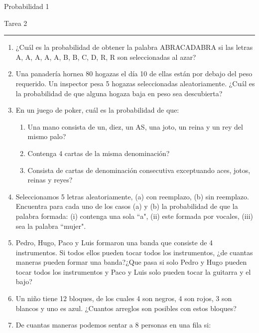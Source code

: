 \documentclass[12pt]{report}
\begin{document}
\begin{center}
    \textsf{\Large Probabilidad 1}
    \par\medskip
    \textsf{\large Tarea 2}
    \end{center}
    \hrule
    \par\bigskip

\begin{enumerate}
    \item ¿Cuál es la probabilidad de obtener la palabra ABRACADABRA si las letras A, A, A, A, A, B, B, C, D, R, R son seleccionadas al azar? 
        \item Una panadería hornea 80 hogazas el día 10 de ellas están por debajo del peso requerido. Un inspector pesa 5 hogazas seleccionadas aleatoriamente. ¿Cuál es la probabilidad de que alguna hogaza baja en peso sea descubierta?
        \item En un juego de poker, cuál es la probabilidad de que:
        \begin{enumerate}
            \item Una mano consista de un, diez, un AS, una joto, un reina y un rey del mismo palo?
            \item Contenga 4 cartas de la misma denominación?
            \item Consista de cartas de denominación consecutiva exceptuando aces, jotos, reinas y reyes?
        \end{enumerate} 
        \item Seleccionamos 5 letras aleatoriamente, (a) con reemplazo, (b) sin reemplazo. Encuentra para cada uno de los casos (a) y (b) la probabilidad de que la palabra formada: (i) contenga una sola ``a", (ii) este formada por vocales, (iii) sea la palabra ``mujer".  
        \item Pedro, Hugo, Paco y Luis formaron una banda que consiste de 4 instrumentos. Si todos ellos pueden tocar todos los instrumentos, ¿de cuantas maneras pueden formar una banda?¿Que pasa si solo Pedro y Hugo pueden tocar todos los instrumentos y Paco y Luis solo pueden tocar la guitarra y el bajo?
        \item Un niño tiene 12 bloques, de los cuales 4 son negros, 4 son rojos, 3 son blancos y uno es azul. ¿Cuantos arreglos son posibles con estos bloques?
        \item De cuantas maneras podemos sentar a 8 personas en una fila si:

\end{enumerate}
\end{document}
